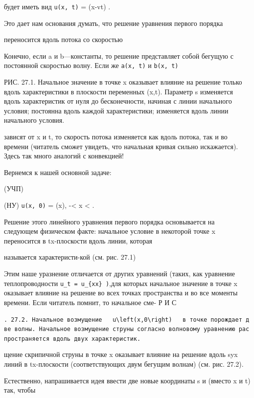 \documentclass[
  ukrainian,
]{article}
\begin{document}
будет иметь вид \texttt{u(x,\ t)} = \varphi(x-vt) .

Это дает нам основания думать, что решение уравнения первого порядка

переносится вдоль потока со скоростью

Конечно, если a и b---константы, то решение представляет собой бегущую с
постоянной скоростью волну. Если же \texttt{a(x,\ t)} и
\texttt{b(x,\ t)}

РИС. 27.1. Начальное значение в точке x оказывает влияние на решение
только вдоль характеристики в плоскости переменных (x,t). Параметр s
изменяется вдоль характеристик от нуля до бесконечности, начиная с линии
начального условия; \tau   постоянна вдоль каждой характеристики;
\tau   изменяется вдоль линии начального условия.

зависят от x и t, то скорость потока изменяется как вдоль потока, так и
во времени (читатель сможет увидеть, что начальная кривая сильно
искажается). Здесь так много аналогий с конвекцией!

Вернемся к нашей основной задаче:

(УЧП)

(НУ) \texttt{u(x,\ 0)} = \varphi(x), -\infty \textless{} x \textless{}
\infty.

Решение этого линейного уравнения первого порядка основывается на
следующем физическом факте: начальное условие в некоторой точке x
переносится в tx-плоскости вдоль линии, которая

называется характеристи-кой (см. рис. 27.1)

Этим наше уразнение отличается от других уравнений (таких, как уравнение
теплопроводности \texttt{u\_t\ =\ u\_\{xx\}\ )},для которых начальное
значение в точке x оказывает влияние на решение во всех точках
пространства и во все моменты времени. Если читатель помнит, то
начальное сме- Р И С

\texttt{.\ 27.2.\ Начальное\ возмущение\ \ \ \textquotesingle{}u\textbackslash{}left(x,0\textbackslash{}right)\textquotesingle{}\ \ \ в\ точке\ порождает\ две\ волны.\ Начальное\ возмущение\ струны\ согласно\ волновому\ уравнению\ распространяется\ вдоль\ двух\ характеристик.}

щение скрипичной струны в точке x оказывает влияние на решение вдоль
\partial syx линий в tx-плоскости (соответствующих двум бегущим волнам)
(см. рис. 27.2).

Естественно, напрашивается идея ввести две новые координаты s и
\tau   (вместо x и t) так, чтобы
\end{document}
